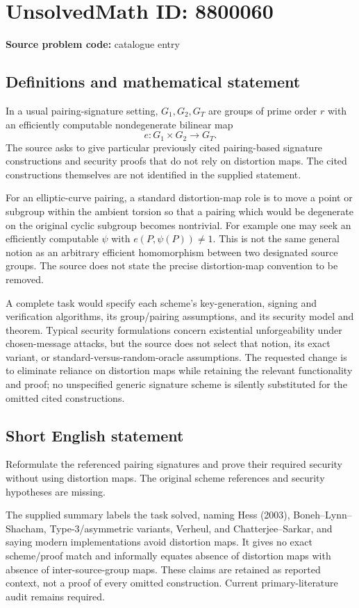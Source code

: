 \documentclass[11pt]{article}
\begin{document}
\section*{UnsolvedMath ID: 8800060}
\textbf{Source problem code:} catalogue entry
\subsection{Definitions and mathematical statement}
In a usual pairing-signature setting, $G_1,G_2,G_T$ are groups of prime order $r$ with an efficiently computable nondegenerate bilinear map
\[
 e:G_1\times G_2\to G_T.
\]
The source asks to give particular previously cited pairing-based signature constructions and security proofs that do not rely on distortion maps. The cited constructions themselves are not identified in the supplied statement.

For an elliptic-curve pairing, a standard distortion-map role is to move a point or subgroup within the ambient torsion so that a pairing which would be degenerate on the original cyclic subgroup becomes nontrivial. For example one may seek an efficiently computable $\psi$ with $e(P,\psi(P))\ne1$. This is not the same general notion as an arbitrary efficient homomorphism between two designated source groups. The source does not state the precise distortion-map convention to be removed.

A complete task would specify each scheme's key-generation, signing and verification algorithms, its group/pairing assumptions, and its security model and theorem. Typical security formulations concern existential unforgeability under chosen-message attacks, but the source does not select that notion, its exact variant, or standard-versus-random-oracle assumptions. The requested change is to eliminate reliance on distortion maps while retaining the relevant functionality and proof; no unspecified generic signature scheme is silently substituted for the omitted cited constructions.
\subsection{Short English statement}
Reformulate the referenced pairing signatures and prove their required security without using distortion maps. The original scheme references and security hypotheses are missing.

The supplied summary labels the task solved, naming Hess (2003), Boneh--Lynn--Shacham, Type-3/asymmetric variants, Verheul, and Chatterjee--Sarkar, and saying modern implementations avoid distortion maps. It gives no exact scheme/proof match and informally equates absence of distortion maps with absence of inter-source-group maps. These claims are retained as reported context, not a proof of every omitted construction. Current primary-literature audit remains required.
\end{document}
